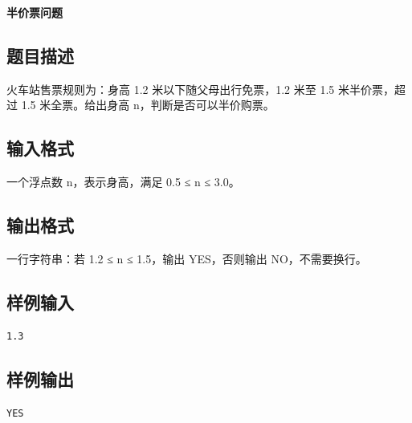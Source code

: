 \documentclass{article}
\newcommand{\problemname}[1]{\begin{center}\Large\bfseries #1\end{center}}
\begin{document}
\problemname{半价票问题}

\subsection*{题目描述}
火车站售票规则为：身高 1.2 米以下随父母出行免票，1.2 米至 1.5 米半价票，超过 1.5 米全票。给出身高 n，判断是否可以半价购票。

\subsection*{输入格式}
一个浮点数 n，表示身高，满足 0.5 ≤ n ≤ 3.0。

\subsection*{输出格式}
一行字符串：若 1.2 ≤ n ≤ 1.5，输出 YES，否则输出 NO，不需要换行。

\subsection*{样例输入}
\begin{verbatim}
1.3
\end{verbatim}

\subsection*{样例输出}
\begin{verbatim}
YES
\end{verbatim}
\end{document}

